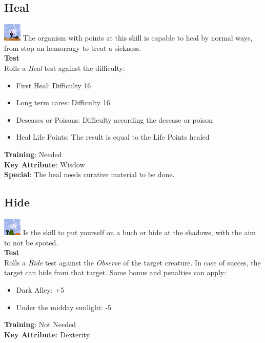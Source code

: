 \documentclass[ letterpaper,12pt]{article}
\begin{document}
\subsection{Heal}
\includegraphics{../data/skills/Img/curar.png}
The organism with points at this skill is capable to heal by normal ways, from stop an hemorragy to treat a sickness.\\
{\bf Test}\\
Rolls a {\it Heal} test against the difficulty:\\
\begin{itemize}
\item{First Heal: Difficulty 16}
\item{Long term cares: Difficulty 16}
\item{Deseases or Poisons: Difficulty according the desease or poison}
\item{Heal Life Points: The result is equal to the Life Points healed}
\end{itemize}
{\bf Training}: Needed\\
{\bf Key Attribute}: Wisdow\\
{\bf Special}: The heal needs curative material to be done.

\subsection{Hide}
\includegraphics{../data/skills/Img/esconder.png}
Is the skill to put yourself on a buch or hide at the shadows, with the aim to not be spoted.\\
{\bf Test}\\
Rolls a {\it Hide} test against the {\it Observe} of the target creature. In case of succes, the target can hide from that target. Some bonus and penalties can apply:\\
\begin{itemize}
\item{Dark Alley:  +5}
\item{Under the midday sunlight: -5}
\end{itemize}
{\bf Training}: Not Needed\\
{\bf Key Attribute}: Dexterity\\
\end{document}
